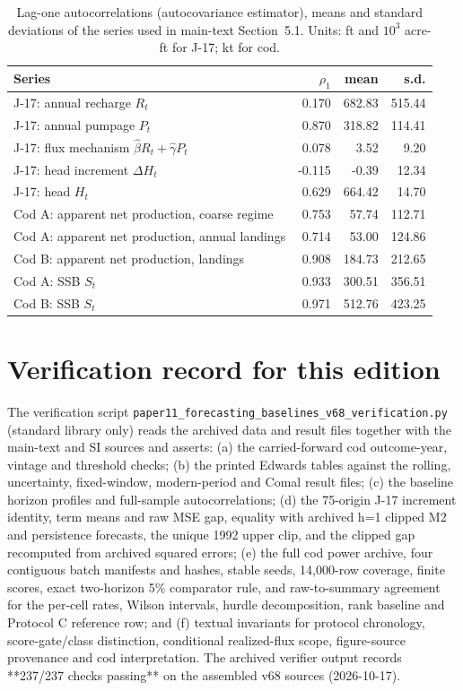 \documentclass[preprint,11pt,authoryear]{elsarticle}
\theoremstyle{remark}
\begin{document}
\begin{table}[!htb]
\centering\footnotesize\setlength{\tabcolsep}{3.5pt}
\caption{Lag-one autocorrelations (autocovariance estimator), means and standard deviations of the series used in main-text Section~5.1. Units: ft and $10^3$ acre-ft for J-17; kt for cod.}
\label{tab:si_autocorr}
\begin{tabular}{@{}lrrr@{}}
\toprule
Series & $\rho_1$ & mean & s.d. \\
\midrule
J-17: annual recharge $R_t$ & 0.170 & 682.83 & 515.44 \\
J-17: annual pumpage $P_t$ & 0.870 & 318.82 & 114.41 \\
J-17: flux mechanism $\hat\beta R_t+\hat\gamma P_t$ & 0.078 & 3.52 & 9.20 \\
J-17: head increment $\Delta H_t$ & -0.115 & -0.39 & 12.34 \\
J-17: head $H_t$ & 0.629 & 664.42 & 14.70 \\
Cod A: apparent net production, coarse regime & 0.753 & 57.74 & 112.71 \\
Cod A: apparent net production, annual landings & 0.714 & 53.00 & 124.86 \\
Cod B: apparent net production, landings & 0.908 & 184.73 & 212.65 \\
Cod A: SSB $S_t$ & 0.933 & 300.51 & 356.51 \\
Cod B: SSB $S_t$ & 0.971 & 512.76 & 423.25 \\
\bottomrule
\end{tabular}
\end{table}

\section{Verification record for this edition}\label{si:verify}

The verification script \texttt{paper11\_forecasting\_\allowbreak{}baselines\_v68\_\allowbreak{}verification.py} (standard library only) reads the archived data and result files together with the main-text and SI sources and asserts: (a) the carried-forward cod outcome-year, vintage and threshold checks; (b) the printed Edwards tables against the rolling, uncertainty, fixed-window, modern-period and Comal result files; (c) the baseline horizon profiles and full-sample autocorrelations; (d) the 75-origin J-17 increment identity, term means and raw MSE gap, equality with archived h=1 clipped M2 and persistence forecasts, the unique 1992 upper clip, and the clipped gap recomputed from archived squared errors; (e) the full cod power archive, four contiguous batch manifests and hashes, stable seeds, 14,000-row coverage, finite scores, exact two-horizon 5\% comparator rule, and raw-to-summary agreement for the per-cell rates, Wilson intervals, hurdle decomposition, rank baseline and Protocol C reference row; and (f) textual invariants for protocol chronology, score-gate/class distinction, conditional realized-flux scope, figure-source provenance and cod interpretation. The archived verifier output records **237/237 checks passing** on the assembled v68 sources (2026-10-17).
\end{document}
